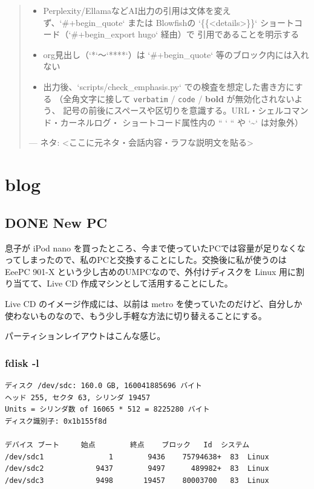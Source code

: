 \documentclass[11pt]{article}
\begin{document}
\begin{quote}
\begin{itemize}
\item Perplexity/EllamaなどAI出力の引用は文体を変えず、`\#+begin\_quote` または
Blowfishの `\{\{<details>\}\}` ショートコード（`\#+begin\_export hugo` 経由）で
引用であることを明示する
\item org見出し（`*`〜`****`）は `\#+begin\_quote` 等のブロック内には入れない
\end{itemize}

\begin{itemize}
\item 出力後、`scripts/check\_emphasis.py` での検査を想定した書き方にする
（全角文字に接して \texttt{verbatim} / \texttt{code} / \textbf{bold} が無効化されないよう、
記号の前後にスペースや区切りを意識する。URL・シェルコマンド・カーネルログ・
ショートコード属性内の `` ` `` や `\textasciitilde{}` は対象外）
\end{itemize}

---
ネタ:
<ここに元ネタ・会話内容・ラフな説明文を貼る>
\end{quote}
\section{blog}
\label{sec:org5be21e4}
\subsection{{\bfseries\sffamily DONE} New PC}
\label{sec:org1b2c84b}
息子が iPod nano を買ったところ、今まで使っていたPCでは容量が足りなくなってしまったので、私のPCと交換することにした。交換後に私が使うのは EeePC 901-X という少し古めのUMPCなので、外付けディスクを Linux 用に割り当てて、Live CD 作成マシンとして活用することにした。

Live CD のイメージ作成には、以前は metro を使っていたのだけど、自分しか使わないものなので、もう少し手軽な方法に切り替えることにする。

パーティションレイアウトはこんな感じ。
\subsubsection{fdisk -l}
\label{sec:org5a763e7}
\begin{verbatim}
ディスク /dev/sdc: 160.0 GB, 160041885696 バイト
ヘッド 255, セクタ 63, シリンダ 19457
Units = シリンダ数 of 16065 * 512 = 8225280 バイト
ディスク識別子: 0x1b155f8d

デバイス ブート     始点        終点    ブロック   Id  システム
/dev/sdc1               1        9436    75794638+  83  Linux
/dev/sdc2            9437        9497      489982+  83  Linux
/dev/sdc3            9498       19457    80003700   83  Linux
\end{verbatim}
\end{document}
